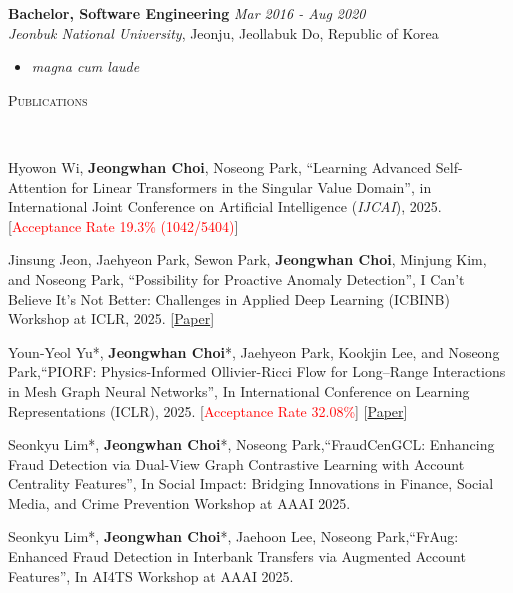 \documentclass[10pt]{article}
\newenvironment{changemargin}[2]{
  \begin{list}{}{
    \setlength{\topsep}{0pt}
    \setlength{\leftmargin}{#1}
    \setlength{\rightmargin}{#2}
    \setlength{\listparindent}{\parindent}
    \setlength{\itemindent}{\parindent}
    \setlength{\parsep}{\parskip}
  }
  \item[]}{\end{list}
}
\newcommand{\lineover}{
	\begin{changemargin}{-0.05in}{-0.05in}
		\vspace*{-8pt}
		\hrulefill \\
		\vspace*{-2pt}
	\end{changemargin}
}
\newcommand{\header}[1]{
	\begin{changemargin}{-0.5in}{-0.5in}
		\scshape{#1}\\
  	\lineover
	\end{changemargin}
}
\newcommand{\presentation}[2]{
	{#1} \hfill \emph{#2}\\ \bigskip
}
\newcommand{\RED}[1]{\textcolor{red}{#1}}
\newenvironment{body} {
	\vspace*{-16pt}
	\begin{changemargin}{-0.25in}{-0.5in}
  }
	{\end{changemargin}
}
\begin{document}
\begin{body}
	\vspace{14pt}
	\textbf{Bachelor, Software Engineering} \hfill \emph{Mar 2016 -  Aug 2020} \\
	\emph{Jeonbuk National University}, Jeonju, Jeollabuk Do, Republic of Korea \\
	\begin{itemize} \itemsep -0pt  %
        \item \textit{magna cum laude}
	\end{itemize}
\end{body}

\medskip


\header{Publications}

\begin{body}
	\vspace{14pt}

\presentation{
 Hyowon Wi, \textbf{Jeongwhan Choi}, Noseong Park, ``Learning Advanced Self-Attention for Linear Transformers in the Singular Value Domain'', in International Joint Conference on Artificial Intelligence (\textit{IJCAI}), 2025. [\RED{Acceptance Rate 19.3\% (1042/5404)}]}{}

\presentation{
Jinsung Jeon, Jaehyeon Park, Sewon Park, \textbf{Jeongwhan Choi}, Minjung Kim, and Noseong Park, ``Possibility for Proactive Anomaly Detection'', I Can't Believe It's Not Better: Challenges in Applied Deep Learning (ICBINB) Workshop at ICLR, 2025. [\href{https://openreview.net/forum?id=w63aCqNRFp}{Paper}]}{}

\presentation{
Youn-Yeol Yu*, \textbf{Jeongwhan Choi}*, Jaehyeon Park, Kookjin Lee, and Noseong Park,``PIORF: Physics-Informed Ollivier-Ricci Flow for Long–Range Interactions in Mesh Graph Neural Networks'', In International Conference on Learning Representations (ICLR), 2025. [\RED{Acceptance Rate 32.08\%}] [\href{https://openreview.net/forum?id=qkBBHixPow}{Paper}]}{}

 \presentation{
Seonkyu Lim*, \textbf{Jeongwhan Choi}*, Noseong Park,``FraudCenGCL: Enhancing Fraud Detection via Dual-View Graph Contrastive Learning with Account Centrality Features'', In Social Impact: Bridging Innovations in Finance, Social Media, and Crime Prevention Workshop at AAAI 2025.}{}

 \presentation{
Seonkyu Lim*, \textbf{Jeongwhan Choi}*, Jaehoon Lee, Noseong Park,``FrAug: Enhanced Fraud Detection in Interbank Transfers via Augmented Account Features'', In AI4TS Workshop at AAAI 2025.}{}


\end{body}
\end{document}
